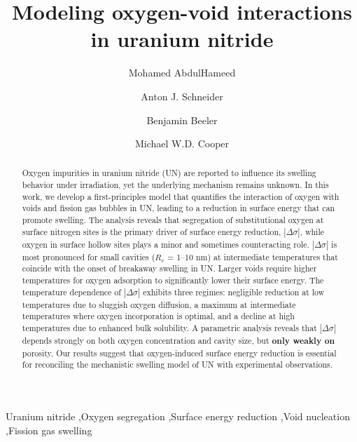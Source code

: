 \documentclass[preprint,12pt,sort&compress]{elsarticle}
\newcommand{\?}{\stackrel{?}{=}}
\providecommand{\DIFaddtex}[1]{{\bf #1}} %
\providecommand{\DIFdeltex}[1]{} %
\providecommand{\DIFaddbegin}{\protect\color{blue}} %
\providecommand{\DIFaddend}{\protect\color{black}} %
\providecommand{\DIFdelbegin}{\protect\color{red}} %
\providecommand{\DIFdelend}{\protect\color{black}} %
\providecommand{\DIFadd}[1]{\texorpdfstring{\DIFaddtex{#1}}{#1}} %
\providecommand{\DIFdel}[1]{\texorpdfstring{\DIFdeltex{#1}}{}} %
\newcommand{\DIFscaledelfig}{0.5}
\newlength{\DIFdelgraphicswidth} %
\newlength{\DIFdelgraphicsheight} %
\newcommand{\DIFaddincludegraphics}[2][]{{\color{blue}\fbox{\DIFOincludegraphics[#1]{#2}}}} %
\newcommand{\DIFdelincludegraphics}[2][]{%
\sbox{\DIFdelgraphicsbox}{\DIFOincludegraphics[#1]{#2}}%
\settoboxwidth{\DIFdelgraphicswidth}{\DIFdelgraphicsbox} %
\settoboxtotalheight{\DIFdelgraphicsheight}{\DIFdelgraphicsbox} %
\scalebox{\DIFscaledelfig}{%
\parbox[b]{\DIFdelgraphicswidth}{\usebox{\DIFdelgraphicsbox}\\[-\baselineskip] \rule{\DIFdelgraphicswidth}{0em}}\llap{\resizebox{\DIFdelgraphicswidth}{\DIFdelgraphicsheight}{%
\setlength{\unitlength}{\DIFdelgraphicswidth}%
\begin{picture}(1,1)%
\thicklines\linethickness{2pt} %
{\color[rgb]{1,0,0}\put(0,0){\framebox(1,1){}}}%
{\color[rgb]{1,0,0}\put(0,0){\line( 1,1){1}}}%
{\color[rgb]{1,0,0}\put(0,1){\line(1,-1){1}}}%
\end{picture}%
}\hspace*{3pt}}} %
} %
\DeclareRobustCommand{\DIFaddbegin}{\DIFOaddbegin \let\includegraphics\DIFaddincludegraphics} %
\DeclareRobustCommand{\DIFaddend}{\DIFOaddend \let\includegraphics\DIFOincludegraphics} %
\DeclareRobustCommand{\DIFdelbegin}{\DIFOdelbegin \let\includegraphics\DIFdelincludegraphics} %
\DeclareRobustCommand{\DIFdelend}{\DIFOaddend \let\includegraphics\DIFOincludegraphics} %
\begin{document}
\begin{frontmatter}

\title{Modeling oxygen-void interactions in uranium nitride}

\author[ncsu]{Mohamed AbdulHameed}
\author[lanl]{Anton J. Schneider}
\author[ncsu,inl]{Benjamin Beeler}
\author[lanl]{Michael W.D. Cooper}

\address[ncsu]{Department of Nuclear Engineering, North Carolina State University, Raleigh, NC 27695}
\address[lanl]{Los Alamos National Laboratory, Los Alamos, NM 87545}
\address[inl]{Idaho National Laboratory, Idaho Falls, ID 83415}

\begin{abstract}

Oxygen impurities in uranium nitride (UN) are reported to influence its swelling behavior under irradiation, yet the underlying mechanism remains unknown. In this work, we develop a first-principles model that quantifies the interaction of oxygen with voids and fission gas bubbles in UN, leading to a reduction in surface energy that can promote swelling. The analysis reveals that segregation of substitutional oxygen at surface nitrogen sites is the primary driver of surface energy reduction, $|\Delta \sigma|$, while oxygen in surface hollow sites plays a minor and sometimes counteracting role. $|\Delta \sigma|$ is most pronounced for small cavities ($R_v$ = 1--10 nm) at intermediate temperatures that coincide with the onset of breakaway swelling in UN. Larger voids require higher temperatures for oxygen adsorption to significantly lower their surface energy. The temperature dependence of $|\Delta \sigma|$ exhibits three regimes: negligible reduction at low temperatures due to sluggish oxygen diffusion, a maximum at intermediate temperatures where oxygen incorporation is optimal, and a decline at high temperatures due to enhanced bulk solubility. A parametric analysis reveals that $|\Delta \sigma|$ depends strongly on both oxygen concentration and cavity size, but \DIFdelbegin \DIFdel{is largely insensitive to }\DIFdelend \DIFaddbegin \DIFadd{only weakly on }\DIFaddend porosity. Our results suggest that oxygen-induced surface energy reduction is essential for reconciling the mechanistic swelling model of UN with experimental observations.

\end{abstract}

\begin{keyword}
Uranium nitride \sep Oxygen segregation \sep Surface energy reduction \sep Void nucleation \sep Fission gas swelling
\end{keyword}

\end{frontmatter}
\end{document}
